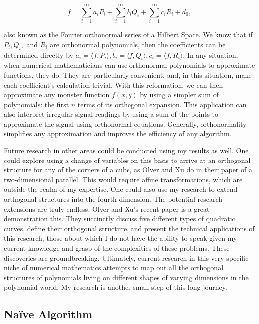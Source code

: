 \documentclass[letterpaper, 12pt]{article}
\begin{document}
\vspace*{-1mm}
$$f = \sum_{i=1}^\infty a_i P_i + \sum_{i=1}^\infty b_i Q_i + \sum_{i=1}^\infty c_i R_i + d_0,$$

\vspace*{4mm}
\noindent also known as the Fourier orthonormal series of a Hilbert Space. We know that if $P_i, Q_i,$ and $ R_i$ are orthonormal polynomials, then the coefficients can be determined directly by $a_i = \langle f, P_i\rangle, b_i = \langle f, Q_i\rangle, c_i = \langle f,R_i\rangle$. In any situation, when numerical mathematicians can use orthonormal polynomials to approximate functions, they do. They are particularly convenient, and, in this situation, make each coefficient's calculation trivial. With this reformation, we can then approximate any monster function $f(x,y)$ by using a simpler sum of polynomials: the first $n$ terms of its orthogonal expansion. This application can also interpret irregular signal readings by using a sum of the points to approximate the signal using orthonormal equations. Generally, orthonormality simplifies any approximation and improves the efficiency of any algorithm.

Future research in other areas could be conducted using my results as well. One could explore using a change of variables on this basis to arrive at an orthogonal structure for any of the corners of a cube, as Olver and Xu do in their paper of a two-dimensional parallel. This would require affine transformations, which are outside the realm of my expertise. One could also use my research to extend orthogonal structures into the fourth dimension. The potential research extensions are truly endless. Olver and Xu's recent paper is a great demonstration this. They succinctly discuss five different types of quadratic curves, define their orthogonal structure, and present the technical applications of this research, those about which I do not have the ability to speak given my current knowledge and grasp of the complexities of these problems. These discoveries are groundbreaking. Ultimately, current research in this very specific niche of numerical mathematics attempts to map out all the orthogonal structures of polynomials living on different shapes of varying dimensions in the polynomial world. My research is another small step of this long journey.  







\newpage
\begin{centering}\section{Na\"ive Algorithm}\end{centering}
\end{document}
